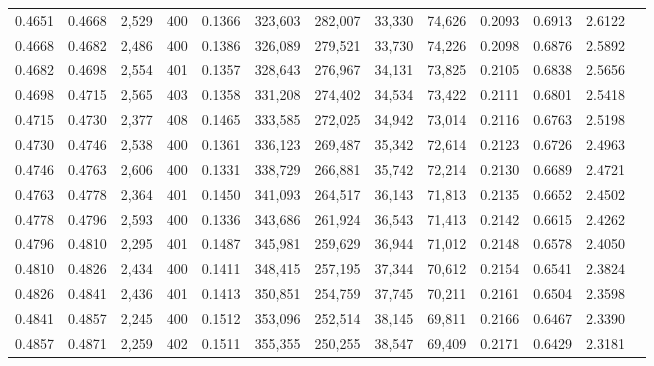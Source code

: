 \begin{tabular}{rrrrrrrrrrrrr}
0.4651 & 0.4668 &  2,529 & 400 &                                     0.1366 & 323,603 & 282,007 &  33,330 &  74,626 & 0.2093 & 0.6913 & 2.6122 \\
0.4668 & 0.4682 &  2,486 & 400 &                                     0.1386 & 326,089 & 279,521 &  33,730 &  74,226 & 0.2098 & 0.6876 & 2.5892 \\
0.4682 & 0.4698 &  2,554 & 401 &                                     0.1357 & 328,643 & 276,967 &  34,131 &  73,825 & 0.2105 & 0.6838 & 2.5656 \\
0.4698 & 0.4715 &  2,565 & 403 &                                     0.1358 & 331,208 & 274,402 &  34,534 &  73,422 & 0.2111 & 0.6801 & 2.5418 \\
0.4715 & 0.4730 &  2,377 & 408 &                                     0.1465 & 333,585 & 272,025 &  34,942 &  73,014 & 0.2116 & 0.6763 & 2.5198 \\
0.4730 & 0.4746 &  2,538 & 400 &                                     0.1361 & 336,123 & 269,487 &  35,342 &  72,614 & 0.2123 & 0.6726 & 2.4963 \\
0.4746 & 0.4763 &  2,606 & 400 &                                     0.1331 & 338,729 & 266,881 &  35,742 &  72,214 & 0.2130 & 0.6689 & 2.4721 \\
0.4763 & 0.4778 &  2,364 & 401 &                                     0.1450 & 341,093 & 264,517 &  36,143 &  71,813 & 0.2135 & 0.6652 & 2.4502 \\
0.4778 & 0.4796 &  2,593 & 400 &                                     0.1336 & 343,686 & 261,924 &  36,543 &  71,413 & 0.2142 & 0.6615 & 2.4262 \\
0.4796 & 0.4810 &  2,295 & 401 &                                     0.1487 & 345,981 & 259,629 &  36,944 &  71,012 & 0.2148 & 0.6578 & 2.4050 \\
0.4810 & 0.4826 &  2,434 & 400 &                                     0.1411 & 348,415 & 257,195 &  37,344 &  70,612 & 0.2154 & 0.6541 & 2.3824 \\
0.4826 & 0.4841 &  2,436 & 401 &                                     0.1413 & 350,851 & 254,759 &  37,745 &  70,211 & 0.2161 & 0.6504 & 2.3598 \\
0.4841 & 0.4857 &  2,245 & 400 &                                     0.1512 & 353,096 & 252,514 &  38,145 &  69,811 & 0.2166 & 0.6467 & 2.3390 \\
0.4857 & 0.4871 &  2,259 & 402 &                                     0.1511 & 355,355 & 250,255 &  38,547 &  69,409 & 0.2171 & 0.6429 & 2.3181 \\

\end{tabular}
